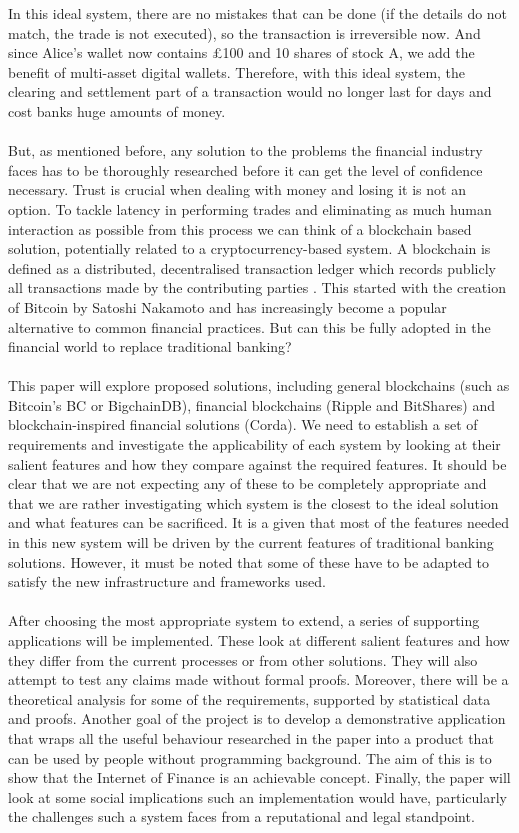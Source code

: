 \documentclass[12pt,twoside]{article}
\begin{document}
In this ideal system, there are no mistakes that can be done (if the details do not match, the trade is not executed), so the transaction is irreversible now. And since Alice's wallet now contains \pounds 100 and 10 shares of stock A, we add the benefit of multi-asset digital wallets. Therefore, with this ideal system, the clearing and settlement part of a transaction would no longer last for days and cost banks huge amounts of money.
\\ \\
But, as mentioned before, any solution to the problems the financial industry faces has to be thoroughly researched before it can get the level of confidence necessary. Trust is crucial when dealing with money and losing it is not an option. To tackle latency in performing trades and eliminating as much human interaction as possible from this process we can think of a blockchain based solution, potentially related to a cryptocurrency-based system. A blockchain is defined as a distributed, decentralised transaction ledger which records publicly all transactions made by the contributing parties \cite{pwc}. This started with the creation of Bitcoin by Satoshi Nakamoto and has increasingly become a popular alternative to common financial practices. But can this be fully adopted in the financial world to replace traditional banking?
\\ \\
This paper will explore proposed solutions, including general blockchains (such as Bitcoin's BC or BigchainDB), financial blockchains (Ripple and BitShares) and blockchain-inspired financial solutions (Corda). We need to establish a set of requirements and investigate the applicability of each system by looking at their salient features and how they compare against the required features. It should be clear that we are not expecting any of these to be completely appropriate and that we are rather investigating which system is the closest to the ideal solution and what features can be sacrificed. It is a given that most of the features needed in this new system will be driven by the current features of traditional banking solutions. However, it must be noted that some of these have to be adapted to satisfy the new infrastructure and frameworks used.
\\ \\
After choosing the most appropriate system to extend, a series of supporting applications will be implemented. These look at different salient features and how they differ from the current processes or from other solutions. They will also attempt to test any claims made without formal proofs. Moreover, there will be a theoretical analysis for some of the requirements, supported by statistical data and proofs. Another goal of the project is to develop a demonstrative application that wraps all the useful behaviour researched in the paper into a product that can be used by people without programming background. The aim of this is to show that the Internet of Finance \cite{CMM:RN} is an achievable concept. Finally, the paper will look at some social implications such an implementation would have, particularly the challenges such a system faces from a reputational and legal standpoint.
\end{document}
